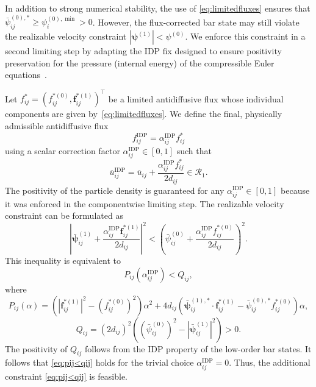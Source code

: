 \documentclass[preprint, 11pt]{elsarticle}
\newcommand{\f}{\mathbf{f}}
\newcommand{\pz}{\psi^{(0)}}
\newcommand{\po}{\boldsymbol{\psi}^{(1)}}
\begin{document}
In addition to strong numerical stability, the use of
\eqref{eq:limitedfluxes} ensures that $\bar\psi^{(0),*}_{ij}\geq\psi_i^{(0),\min}>0$.
However, the flux-corrected bar state may still violate
the realizable velocity constraint $|\po|<\pz$.
We enforce this constraint in a second limiting step
by adapting the IDP fix designed to ensure positivity
preservation for the pressure (internal energy)
of the compressible Euler equations~\cite{kuzmin2020, kuzmin2023}.

Let $f_{ij}^* = (f_{ij}^{*(0)}, \f_{ij}^{*(1)})^\top$ be a
limited antidiffusive flux whose individual components are
given by~\eqref{eq:limitedfluxes}. We define the
final, physically admissible antidiffusive flux
\begin{equation*}
    f_{ij}^{\mathrm{IDP}} = \alpha_{ij}^{\mathrm{IDP}} f_{ij}^*
\end{equation*}
using a scalar correction factor 
$\alpha_{ij}^{\mathrm{IDP}}\in[0,1]$ such that
\begin{equation}\label{eq:HOIDPbarstats}
    \overline{u}_{ij}^{\mathrm{IDP}} = \overline{u}_{ij} +\frac{\alpha_{ij}^{\mathrm{IDP}} f_{ij}^*}{2d_{ij}} \in\mathcal{R}_1.
\end{equation}
The positivity of the particle density is guaranteed for any
$\alpha_{ij}^{\mathrm{IDP}}\in[0,1]$ because it was enforced
in the componentwise limiting step. The
realizable velocity constraint can be formulated as
\begin{equation*}
    \left|\bar{\bm\psi}^{(1)}_{ij} + \frac{\alpha_{ij}^{\mathrm{IDP}} \f_{ij}^{*(1)}}{2d_{ij}}\right|^2 
    < \left(\bar\psi^{(0)}_{ij} + \frac{\alpha_{ij}^{\mathrm{IDP}} f_{ij}^{*(0)}}{2d_{ij}}\right)^2.
\end{equation*}
This inequality is equivalent to 
\begin{equation}\label{eq:pij<qij}
    P_{ij}(\alpha_{ij}^{\mathrm{IDP}}) < Q_{ij},%
\end{equation}
where 
\begin{equation*}
    P_{ij}(\alpha) = \left(\left|\f_{ij}^{*(1)}\right|^2 - \left(f_{ij}^{*(0)}\right)^2 \right)\alpha^2 
    + 4 d_{ij} \left(\bar{\bm\psi}^{(1),*}_{ij}\cdot \f_{ij}^{*(1)} -  \bar\psi^{(0),*}_{ij}f_{ij}^{*(0)}\right)\alpha,
\end{equation*}
\begin{equation*}
    Q_{ij} = (2d_{ij})^2\left(
    \left(\bar\psi^{(0)}_{ij}\right)^2 - \left|\bar{\bm\psi}^{(1)}_{ij}\right|^2\right) > 0.
\end{equation*}
The positivity of $Q_{ij}$ follows from the IDP property of the low-order bar states. It follows that \eqref{eq:pij<qij} holds for the trivial choice $\alpha_{ij}^{\mathrm{IDP}} = 0$. Thus, the additional constraint \eqref{eq:pij<qij} is feasible.
\end{document}
